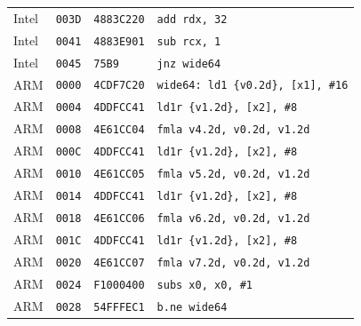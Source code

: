 \begin{table}[htbp]
\begin{tabular}{@{}l|l|l|p{7.2cm}@{}}
Intel & \texttt{003D} & \texttt{4883C220} & \texttt{add rdx, 32} \\
Intel & \texttt{0041} & \texttt{4883E901} & \texttt{sub rcx, 1} \\
Intel & \texttt{0045} & \texttt{75B9} & \texttt{jnz wide64} \\
\midrule
ARM & \texttt{0000} & \texttt{4CDF7C20} & \texttt{wide64: ld1 \{v0.2d\}, [x1], \#16} \\
ARM & \texttt{0004} & \texttt{4DDFCC41} & \texttt{ld1r \{v1.2d\}, [x2], \#8} \\
ARM & \texttt{0008} & \texttt{4E61CC04} & \texttt{fmla v4.2d, v0.2d, v1.2d} \\
ARM & \texttt{000C} & \texttt{4DDFCC41} & \texttt{ld1r \{v1.2d\}, [x2], \#8} \\
ARM & \texttt{0010} & \texttt{4E61CC05} & \texttt{fmla v5.2d, v0.2d, v1.2d} \\
ARM & \texttt{0014} & \texttt{4DDFCC41} & \texttt{ld1r \{v1.2d\}, [x2], \#8} \\
ARM & \texttt{0018} & \texttt{4E61CC06} & \texttt{fmla v6.2d, v0.2d, v1.2d} \\
ARM & \texttt{001C} & \texttt{4DDFCC41} & \texttt{ld1r \{v1.2d\}, [x2], \#8} \\
ARM & \texttt{0020} & \texttt{4E61CC07} & \texttt{fmla v7.2d, v0.2d, v1.2d} \\
ARM & \texttt{0024} & \texttt{F1000400} & \texttt{subs x0, x0, \#1} \\
ARM & \texttt{0028} & \texttt{54FFFEC1} & \texttt{b.ne wide64} \\
\bottomrule
\end{tabular}
\endgroup
\end{table}
\noindent{}\par
